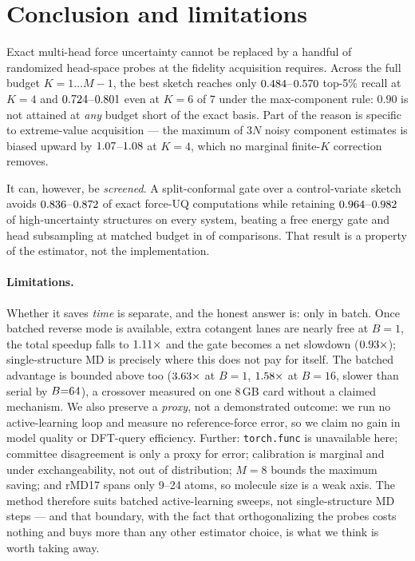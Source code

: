 \documentclass{article}
\begin{document}
\section{Conclusion and limitations}
\label{sec:limitations}
Exact multi-head force uncertainty cannot be replaced by a handful of randomized head-space probes at
the fidelity acquisition requires. Across the full budget $K=1\ldots M{-}1$, the best sketch reaches
only $0.484$--$0.570$ top-5\% recall at $K{=}4$ and
$0.724$--$0.801$ even at $K{=}6$ of $7$ under the max-component rule:
$0.90$ is not attained at \emph{any} budget short of the exact basis. Part of the reason is specific
to extreme-value acquisition --- the maximum of $3N$ noisy component estimates is biased upward by
$1.07$--$1.08$ at $K{=}4$, which no marginal finite-$K$ correction removes.

It can, however, be \emph{screened}. A split-conformal gate over a control-variate sketch avoids
$0.836$--$0.872$ of exact force-UQ computations while retaining
$0.964$--$0.982$ of high-uncertainty structures on every system, beating a
free energy gate and head subsampling at matched budget in \fsGateCVDominates{} of
\fsGateCVComparisons{} comparisons. That result is a property of the estimator, not the
implementation.

\paragraph{Limitations.}
Whether it saves \emph{time} is separate, and the honest answer is: only in batch. Once batched
reverse mode is available, extra cotangent lanes are nearly free at $B{=}1$, the total speedup falls
to $1.11\times$ and the gate becomes a net slowdown
($0.93\times$); single-structure MD is precisely where this does not pay for
itself. The batched advantage is bounded above too ($3.63\times$ at $B{=}1$,
$1.58\times$ at $B{=}16$, slower than serial by $B{=}64$), a
crossover measured on one 8\,GB card without a claimed mechanism. We also preserve a \emph{proxy},
not a demonstrated outcome: we run no active-learning loop and measure no reference-force error, so
we claim no gain in model quality or DFT-query efficiency. Further: \texttt{torch.func} is
unavailable here; committee disagreement is only a proxy for error; calibration is marginal and
under exchangeability, not out of distribution; $M{=}8$ bounds the maximum saving; and rMD17 spans
only 9--24 atoms, so molecule size is a weak axis. The method therefore suits batched
active-learning sweeps, not single-structure MD steps --- and that boundary, with the fact that
orthogonalizing the probes costs nothing and buys more than any other estimator choice, is what we
think is worth taking away.
\end{document}
